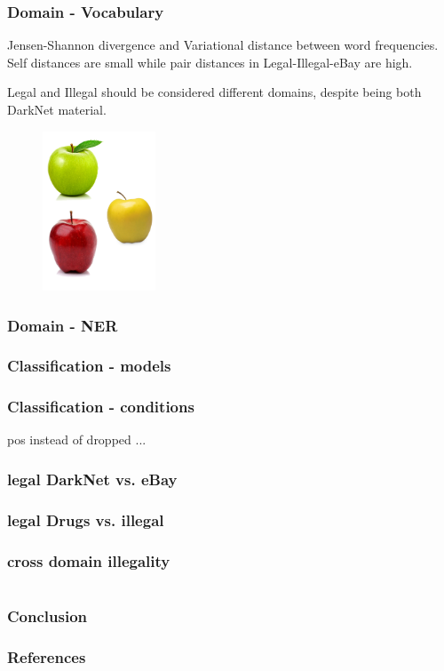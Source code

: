 \documentclass[t,xcolor={svgnames,table}]{beamer}
\begin{document}
\begin{frame}
	\frametitle{Domain - Vocabulary}
	Jensen-Shannon divergence and Variational distance between word frequencies.
	Self distances are small while pair distances in Legal-Illegal-eBay are high.
	
	Legal and Illegal should be considered different domains, despite being both DarkNet material.
	\begin{figure}
		\centering
		\includegraphics[width=0.3\textwidth]{3different.png}
	\end{figure}

\end{frame}

\begin{frame}
	\frametitle{Domain - NER}
\end{frame}

\begin{frame}
	\frametitle{Classification - models}
\end{frame}
\begin{frame}
	\frametitle{Classification - conditions}
	pos instead of
	dropped 
	...
\end{frame}

\begin{frame}
	\frametitle{legal DarkNet vs. eBay}
\end{frame}
\begin{frame}
	\frametitle{legal Drugs vs. illegal}
\end{frame}
\begin{frame}
	\frametitle{cross domain illegality}
\end{frame}
\section*{}

\begin{frame}
\frametitle{Conclusion}
\end{frame}

\begin{frame}[allowframebreaks]
\frametitle{References}

\tiny
\end{frame}
\end{document}
